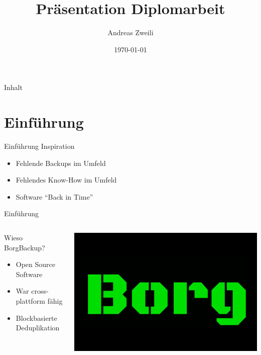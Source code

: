 \documentclass[aspectratio=1610]{beamer}
\author{Andreas Zweili}
\date{\today}
\title{Präsentation Diplomarbeit}
\begin{document}
\maketitle\newpage
\begin{frame}{Inhalt}
\tableofcontents
\end{frame}


\section{Einführung}
\label{sec:orgc228211}
\begin{frame}[label={sec:orgbe50b36}]{Einführung}
\alert{Inspiration}
\begin{itemize}
\item <2-> Fehlende Backups im Umfeld
\item <3-> Fehlendes Know-How im Umfeld
\item <4-> Software "`Back in Time"'
\end{itemize}
\end{frame}

\begin{frame}[label={sec:orgcc7a93d}]{Einführung}
\begin{columns}
\begin{column}{0.5\columnwidth}
\alert{Wieso BorgBackup?}
\begin{itemize}
\item <3-> Open Source Software
\item <4-> War cross-plattform fähig
\item <5-> Blockbasierte Deduplikation
\end{itemize}
\end{column}

\begin{column}{0.5\columnwidth}
\begin{center}
\includegraphics[width=.9\linewidth]{pictures/borg.jpeg}
\end{center}
\end{column}
\end{columns}
\end{frame}
\end{document}
